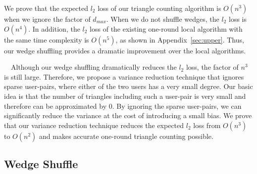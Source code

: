 We prove that the expected $l_2$ loss of our triangle counting algorithm is 
$O(n^3)$ when we ignore the factor of $d_{max}$. 
When we do not shuffle wedges, the 
$l_2$ loss is 
$O(n^4)$. 
In addition, the $l_2$ loss of the existing one-round local algorithm \cite{Imola_USENIX22} with the same time complexity is $O(n^5)$, as shown in 
Appendix~\ref{sec:upper}. 
Thus, our wedge shuffling provides a dramatic improvement over the local algorithms. 

\smallskip
{}~~Although our wedge shuffling dramatically reduces the $l_2$ loss, the factor of $n^3$ is still large. 
Therefore, we propose a variance reduction technique that ignores sparse user-pairs, where either of the two users has a very small degree. 
Our basic idea is that the number of triangles including such a user-pair is very small 
and therefore can be approximated by $0$. 
By ignoring the sparse user-pairs, we can significantly reduce the variance at the cost of introducing a small bias. 
We prove that our variance reduction technique reduces the expected $l_2$ loss from $O(n^3)$ to $O(n^2)$ and makes accurate one-round triangle counting possible. 

\subsection{Wedge Shuffle}
\label{sub:wedge}

